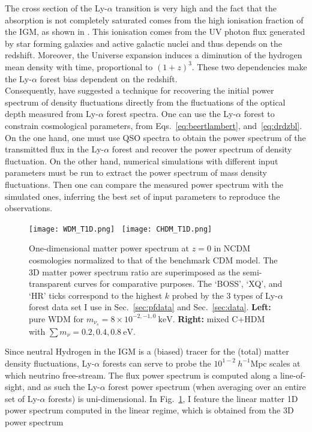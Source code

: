 The cross section of the Ly-$\alpha$ transition is very high and the fact that the absorption is not completely saturated comes
from the high ionisation fraction of the IGM, as shown in \cite{Gunn1965}. This ionisation comes from the UV photon flux generated
by star forming galaxies and active galactic nuclei and thus depends on the redshift. Moreover, the Universe expansion induces a
diminution of the hydrogen mean density with time, proportional to $(1+z)^3$. These two dependencies make the Ly-$\alpha$ forest bias dependent on the redshift. \\

Consequently, \cite{Croft1998} have suggested a technique for recovering the initial power spectrum of density fluctuations
directly from the fluctuations of the optical depth measured from Ly-$\alpha$ forest spectra. One can use the Ly-$\alpha$
forest to constrain cosmological parameters, from Eqs.~\ref{eq:beertlambert}, and~\ref{eq:drdzbl}. On the one
hand, one must use QSO spectra to obtain the power spectrum of the transmitted flux in the Ly-$\alpha$ forest and recover the power
spectrum of density fluctuation. On the other hand, numerical simulations with different input parameters must be run to extract
the power spectrum of mass density fluctuations. Then one can compare the measured power spectrum with the simulated ones,
inferring the best set of input parameters to reproduce the observations. \\

\begin{figure}
\begin{center}
\texttt{[image: WDM\_T1D.png]}~%
\texttt{[image: CHDM\_T1D.png]}
\caption{One-dimensional matter power spectrum at $z=0$ in NCDM cosmologies normalized to that of the benchmark CDM model. The 3D matter power spectrum ratio are superimposed as the semi-transparent curves for comparative purposes. The `BOSS', `XQ', and `HR' ticks correspond to the highest $k$ probed by the 3 types of Ly-$\alpha$ forest data set I use in Sec.~\ref{sec:pfdata} and Sec.~\ref{sec:data}. \textbf{Left:} pure WDM for $m_{\nu_s} = 8 \times 10^{-2, -1, 0}~\mathrm{keV}$. \textbf{Right:} mixed C+HDM with $\sum m_\nu = 0.2, 0.4, 0.8~\mathrm{eV}$.}
\label{fig:t1d}
\end{center}
\end{figure}

Since neutral Hydrogen in the IGM is a (biased) tracer for the (total) matter density fluctuations, Ly-$\alpha$ forests can serve to probe the $10^{1-2}~ h^{-1}\mathrm{Mpc}$ scales at which neutrino free-stream. The flux power spectrum is computed along a line-of-sight, and as such the Ly-$\alpha$ forest power spectrum (when averaging over an entire set of Ly-$\alpha$ forests) is uni-dimensional. In Fig.~\ref{fig:t1d}, I feature the linear matter 1D power spectrum computed in the linear regime, which is obtained from the 3D power spectrum \\

